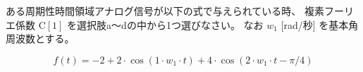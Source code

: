 ある周期性時間領域アナログ信号が以下の式で与えられている時、
複素フーリエ係数 $\textrm{C}[1]$ を選択肢a〜dの中から1つ選びなさい。
なお $w_1$ [rad/秒] を基本角周波数とする。

\[
f(t) = 
-2
+ 2 \cdot \cos( 1 \cdot w_1 \cdot t )
+ 4 \cdot \cos( 2 \cdot w_1 \cdot t - \pi/4)
\]
